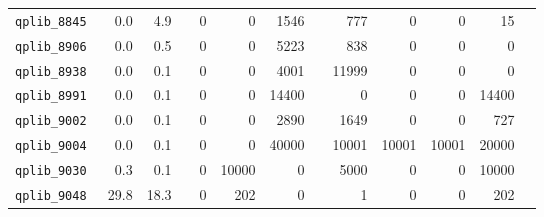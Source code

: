 {\begin{longtable}{lrrrrrrrrrrrr}
{\tt 	qplib\_8845	}	&	0.0	&	4.9	&	&	0	&	0	&	1546	&	&	777	&	0	&	0	&	15	\\
{\tt 	qplib\_8906	}	&	0.0	&	0.5	&	&	0	&	0	&	5223	&	&	838	&	0	&	0	&	0	\\
{\tt 	qplib\_8938	}	&	0.0	&	0.1	&	&	0	&	0	&	4001	&	&	11999	&	0	&	0	&	0	\\
{\tt 	qplib\_8991	}	&	0.0	&	0.1	&	&	0	&	0	&	14400	&	&	0	&	0	&	0	&	14400	\\
{\tt 	qplib\_9002	}	&	0.0	&	0.1	&	&	0	&	0	&	2890	&	&	1649	&	0	&	0	&	727	\\
{\tt 	qplib\_9004	}	&	0.0	&	0.1	&	&	0	&	0	&	40000	&	&	10001	&	10001	&	10001	&	20000	\\
{\tt 	qplib\_9030	}	&	0.3	&	0.1	&	&	0	&	10000	&	0	&	&	5000	&	0	&	0	&	10000	\\
{\tt 	qplib\_9048	}	&	29.8	&	18.3	&	&	0	&	202	&	0	&	&	1	&	0	&	0	&	202	\\


\bottomrule


\end{longtable}

}




